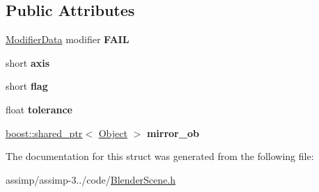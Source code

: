 \subsection*{Public Attributes}
\begin{DoxyCompactItemize}
\item 
\hypertarget{struct_assimp_1_1_blender_1_1_mirror_modifier_data_a48e32ff90893eb62a5b0817fb940df11}{\hyperlink{struct_assimp_1_1_blender_1_1_modifier_data}{Modifier\+Data} modifier {\bfseries F\+A\+I\+L}}\label{struct_assimp_1_1_blender_1_1_mirror_modifier_data_a48e32ff90893eb62a5b0817fb940df11}

\item 
\hypertarget{struct_assimp_1_1_blender_1_1_mirror_modifier_data_a9ee79c90690b00e9a6c4fbb519c97e61}{short {\bfseries axis}}\label{struct_assimp_1_1_blender_1_1_mirror_modifier_data_a9ee79c90690b00e9a6c4fbb519c97e61}

\item 
\hypertarget{struct_assimp_1_1_blender_1_1_mirror_modifier_data_a9ab3c9d5c6b52b8873097c8dc56b6736}{short {\bfseries flag}}\label{struct_assimp_1_1_blender_1_1_mirror_modifier_data_a9ab3c9d5c6b52b8873097c8dc56b6736}

\item 
\hypertarget{struct_assimp_1_1_blender_1_1_mirror_modifier_data_a7b4a2c30e032923bcc4b492696c1ca16}{float {\bfseries tolerance}}\label{struct_assimp_1_1_blender_1_1_mirror_modifier_data_a7b4a2c30e032923bcc4b492696c1ca16}

\item 
\hypertarget{struct_assimp_1_1_blender_1_1_mirror_modifier_data_a30ad182b94823566603c19c26391aadc}{\hyperlink{classboost_1_1shared__ptr}{boost\+::shared\+\_\+ptr}$<$ \hyperlink{struct_assimp_1_1_blender_1_1_object}{Object} $>$ {\bfseries mirror\+\_\+ob}}\label{struct_assimp_1_1_blender_1_1_mirror_modifier_data_a30ad182b94823566603c19c26391aadc}

\end{DoxyCompactItemize}


The documentation for this struct was generated from the following file\+:\begin{DoxyCompactItemize}
\item 
assimp/assimp-\/3../code/\hyperlink{_blender_scene_8h}{Blender\+Scene.\+h}\end{DoxyCompactItemize}
